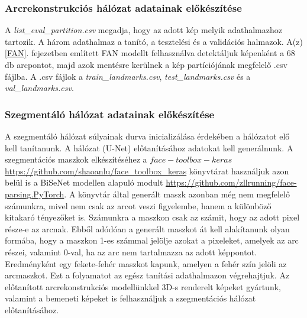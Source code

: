 \documentclass[12pt,a4]{article}
\begin{document}
            \subsubsection{Arcrekonstrukciós hálózat adatainak előkészítése}

            A \textit{list\_eval\_partition.csv} megadja, hogy az adott kép melyik adathalmazhoz tartozik.
           A három adathalmaz a tanító, a tesztelési és a validációs halmazok. A(z) \ref{FAN}. fejezetben említett FAN modellt felhasználva detektáljuk képenként a 68 db arcpontot, majd azok mentésre kerülnek a kép partíciójának megfelelő .csv fájlba. A .csv fájlok a \textit{train\_landmarks.csv}, \textit{test\_landmarks.csv} és a \textit{val\_landmarks.csv}.

            \subsubsection{Szegmentáló hálózat adatainak előkészítése}

             A szegmentáló hálózat súlyainak durva inicializálása érdekében a hálózatot elő kell tanítanunk. A hálózat (U-Net) előtanításához adatokat kell generálnunk. A szegmentációs maszkok elkészítéséhez a $face-toolbox-keras$ \url{https://github.com/shaoanlu/face_toolbox_keras} könyvtárat használjuk azon belül is a BiSeNet modellen alapuló modult \url{https://github.com/zllrunning/face-parsing.PyTorch}. A könyvtár által generált maszk azonban még nem megfelelő számunkra, mivel nem csak az arcot veszi figyelembe, hanem a különböző kitakaró tényezőket is. Számunkra a maszkon csak az számit, hogy az adott pixel része-e az arcnak. Ebből adódóan a generált maszkot át kell alakítanunk olyan formába, hogy a maszkon 1-es számmal jelölje azokat a pixeleket, amelyek az arc részei, valamint 0-val, ha az arc nem tartalmazza az adott képpontot. Eredményként egy fekete-fehér maszkot kapunk, amelyen a fehér szín jelöli az arcmaszkot. Ezt a folyamatot az egész tanítási adathalmazon végrehajtjuk. 
             Az előtanított arcrekonstrukciós modellünkkel 3D-s renderelt képeket gyártunk, valamint a bemeneti képeket is felhasználjuk a szegmentációs hálózat előtanításához.
\end{document}
